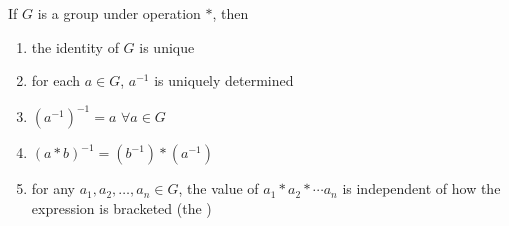 \begin{proposition}
\label{prop:proofgroupop}
If $G$ is a group under operation $*$, then
\begin{enumerate}[label=(\roman*)]
\setlength{\itemsep}{0pt}
\item the identity of $G$ is unique
\item for each $a\in G$, $a^{-1}$ is uniquely determined
\item $(a^{-1})^{-1} = a$ $\forall a\in G$
\item $(a*b)^{-1} = (b^{-1}) * (a^{-1})$
\item for any $a_1, a_2, \ldots, a_n \in G$, the value of $a_1 * a_2 * \cdots a_n$ is independent of how the expression is bracketed (the )
\end{enumerate}
\end{proposition}
